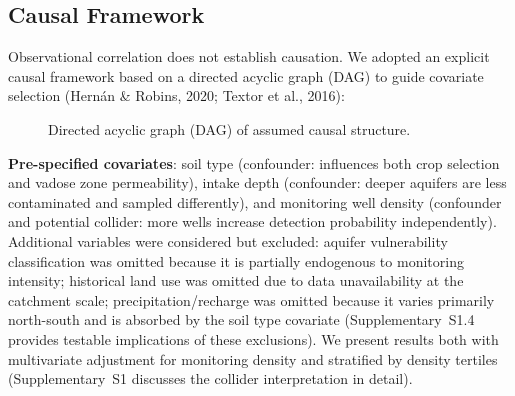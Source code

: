 \documentclass[12pt,a4paper]{article}
\begin{document}
\subsection{Causal Framework}

Observational correlation does not establish causation. We adopted an explicit causal framework based on a directed acyclic graph (DAG) to guide covariate selection (Hern\'an \& Robins, 2020; Textor et al., 2016):

\begin{figure}[H]
\centering
{}
\caption{Directed acyclic graph (DAG) of assumed causal structure.}
\label{fig:dag}
\end{figure}

\textbf{Pre-specified covariates}: soil type (confounder: influences both crop selection and vadose zone permeability), intake depth (confounder: deeper aquifers are less contaminated and sampled differently), and monitoring well density (confounder and potential collider: more wells increase detection probability independently). Additional variables were considered but excluded: aquifer vulnerability classification was omitted because it is partially endogenous to monitoring intensity; historical land use was omitted due to data unavailability at the catchment scale; precipitation/recharge was omitted because it varies primarily north-south and is absorbed by the soil type covariate (Supplementary~S1.4 provides testable implications of these exclusions). We present results both with multivariate adjustment for monitoring density and stratified by density tertiles (Supplementary~S1 discusses the collider interpretation in detail).
\end{document}
